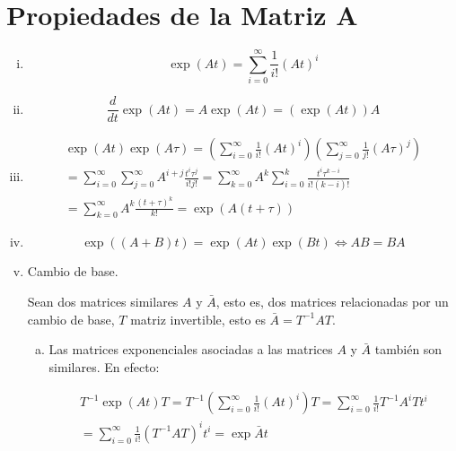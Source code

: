 \section{Propiedades de la Matriz A}
\begin{enumerate}[i)]
\item
\begin{equation}
\exp{(A t)} = \sum\limits_{i=0}^{\infty} \frac{1}{i!} (A t)^i
\end{equation}

\item
\begin{equation}
\frac{d}{dt} \exp{(A t)} = A \exp{(A t)} = (\exp{(A t)}) A
\end{equation}

\item

\begin{multline}
\exp{(At)} \exp{(A \tau)} = \left( \sum\limits_{i=0}^{\infty} \frac{1}{i!} (A t)^i \right) \left( \sum\limits_{j=0}^{\infty} \frac{1}{j!} (A \tau)^j \right) \\
= \sum\limits_{i=0}^{\infty} \sum\limits_{j=0}^{\infty} A^{i+j} \frac{t^i \tau^j}{i! j!} = \sum\limits_{k=0}^{\infty} A^k \sum\limits_{i=0}^{k} \frac{t^i \tau^{k-i}}{i! (k-i)!} \\
= \sum\limits_{k=0}^{\infty} A^k \frac{(t + \tau)^k}{k!} = \exp{(A(t + \tau))}
\end{multline}

\item
\begin{equation}
\exp{((A + B) t)} = \exp{(A t)} \exp{(B t)} \iff A B = B A
\end{equation}

\item Cambio de base.

Sean dos matrices similares $A$ y $\bar{A}$, esto es, dos matrices relacionadas por un cambio de base, $T$ matriz invertible, esto es $\bar{A} = T^{-1} A T$.

\begin{enumerate}[a)]
\item Las matrices exponenciales asociadas a las matrices $A$ y $\bar{A}$ también son similares. En efecto:

\begin{multline}
T^{-1} \exp{(At)} T = T^{-1} \left( \sum\limits_{i=0}^{\infty} \frac{1}{i!} (A t)^i \right) T = \sum\limits_{i=0}^{\infty} \frac{1}{i!} T^{-1} A^i T t^i \\
= \sum\limits_{i=0}^{\infty} \frac{1}{i!} (T^{-1} A T)^i t^i = \exp{\bar{A} t} \nonumber
\end{multline}


\end{enumerate}
\end{enumerate}
